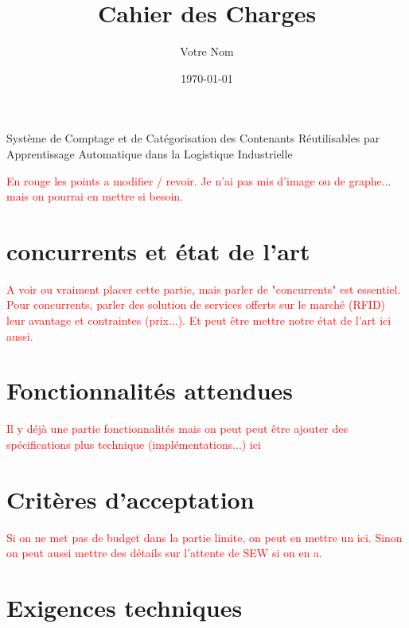 \documentclass{article}
\title{Cahier des Charges}
\author{Votre Nom}
\date{\today}
\begin{document}
\maketitle

\begin{center}
    \LARGE{Système de Comptage et de Catégorisation des Contenants Réutilisables par Apprentissage Automatique dans la Logistique Industrielle}
\end{center}

\textcolor{red}{En rouge les points a modifier / revoir. Je n'ai pas mis d'image ou de graphe... mais on pourrai en mettre si besoin.}

\tableofcontents
\newpage










\section{concurrents et état de l'art}
\textcolor{red}{A voir ou vraiment placer cette partie, mais parler de "concurrents" est essentiel. Pour concurrents, parler des solution de services offerts sur le marché (RFID) leur avantage et contraintes (prix...). Et peut être mettre notre état de l'art ici aussi.}

\section{Fonctionnalités attendues}

\textcolor{red}{Il y déjà  une partie fonctionnalités mais on peut peut être ajouter des spécifications plus technique (implémentations...) ici}

\section{Critères d'acceptation}

\textcolor{red}{Si on ne met pas de budget dans la partie limite, on peut en mettre un ici. Sinon on peut aussi mettre des détails sur l'attente de SEW si on en a.}

\section{Exigences techniques}
\end{document}
